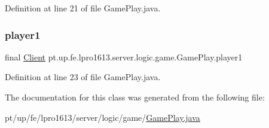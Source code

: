 Definition at line 21 of file Game\+Play.\+java.

\hypertarget{classpt_1_1up_1_1fe_1_1lpro1613_1_1server_1_1logic_1_1game_1_1_game_play_a3dee975f8da8d824316eabe983eb4080}{}\label{classpt_1_1up_1_1fe_1_1lpro1613_1_1server_1_1logic_1_1game_1_1_game_play_a3dee975f8da8d824316eabe983eb4080} 
\subsubsection{\texorpdfstring{player1}{player1}}
{\footnotesize\ttfamily final \hyperlink{classpt_1_1up_1_1fe_1_1lpro1613_1_1server_1_1conn_1_1_client}{Client} pt.\+up.\+fe.\+lpro1613.\+server.\+logic.\+game.\+Game\+Play.\+player1}



Definition at line 23 of file Game\+Play.\+java.



The documentation for this class was generated from the following file\+:\begin{DoxyCompactItemize}
\item 
pt/up/fe/lpro1613/server/logic/game/\hyperlink{_game_play_8java}{Game\+Play.\+java}\end{DoxyCompactItemize}
